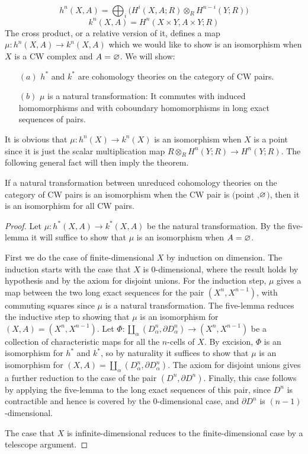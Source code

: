 \[h^n(X,A)=\bigoplus_i\big(H^i(X,A;R)\otimes_R H^{n-i}(Y;R)\big)\]
\[k^n(X,A)=H^n(X\times Y,A\times Y;R)\]
The cross product, or a relative version of it, defines a map $\mu:h^n(X,A)\to k^n(X,A)$ which we would like to show is an isomorphism when $X$ is a CW complex and $A=\varnothing$. We will show:
\begin{itemize}
\item[$(a)$]$h^*$ and $k^*$ are cohomology theories on the category of CW pairs.
\item[$(b)$]$\mu$ is a natural transformation: It commutes with induced homomorphisms and with coboundary homomorphisms in long exact sequences of pairs.
\end{itemize}
It is obvious that $\mu:h^n(X)\to k^n(X)$ is an isomorphism when $X$ is a point since it is just the scalar multiplication map $R\otimes_RH^n(Y;R)\to H^n(Y;R)$. The following general fact will then imply the theorem.
\begin{proposition}
If a natural transformation between unreduced cohomology theories on the category of CW pairs is an isomorphism when the CW pair is $($point ,$\varnothing$$)$,
then it is an isomorphism for all CW pairs.
\end{proposition}
\begin{proof}
Let $\mu:h^*(X,A)\to k^*(X,A)$ be the natural transformation. By the five-lemma
it will suffice to show that $\mu$ is an isomorphism when $A=\varnothing$.\par
First we do the case of finite-dimensional $X$ by induction on dimension. The
induction starts with the case that $X$ is $0$-dimensional, where the result holds by hypothesis and by the axiom for disjoint unions. For the induction step, $\mu$ gives a map between the two long exact sequences for the pair $(X^n,X^{n-1})$, with commuting squares since $\mu$ is a natural transformation. The five-lemma reduces the inductive step to showing that $\mu$ is an isomorphism for $(X,A)=(X^n,X^{n-1})$. Let $\Phi:\coprod_\alpha(D^n_\alpha,\partial D^n_\alpha)\to (X^n,X^{n-1})$ be a collection of characteristic maps for all the $n$-cells of $X$. By excision, $\Phi$ is an isomorphism for $h^*$ and $k^*$, so by naturality it suffices to show that $\mu$ is an isomorphism for $(X,A)=\coprod_\alpha(D^n_\alpha,\partial D^n_\alpha)$. The axiom for disjoint
unions gives a further reduction to the case of the pair $(D^n,\partial D^n)$. Finally, this case follows by applying the five-lemma to the long exact sequences of this pair, since $D^n$ is contractible and hence is covered by the $0$-dimensional case, and $\partial D^n$ is $(n-1)$-dimensional.\par
The case that $X$ is infinite-dimensional reduces to the finite-dimensional case by a telescope argument.
\end{proof}
